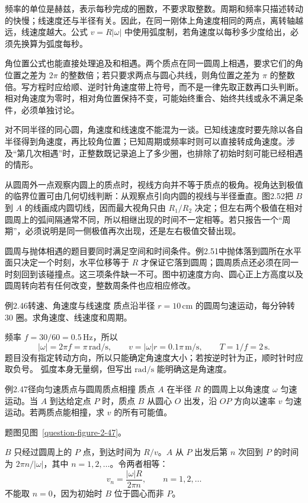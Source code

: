 频率的单位是赫兹，表示每秒完成的圈数，不要求取整数。周期和频率只描述转动的快慢；线速度还与半径有关。因此，在同一刚体上角速度相同的两点，离转轴越远，线速度越大。公式 $v=R|\omega|$ 中使用弧度制，若角速度以每秒多少度给出，必须先换算为弧度每秒。

角位置公式也能直接处理追及和相遇。两个质点在同一圆周上相遇，要求它们的角位置之差为 $2\pi$ 的整数倍；若只要求两点与圆心共线，则角位置之差为 $\pi$ 的整数倍。写方程时应给顺、逆时针角速度带上符号，而不是一律先取正数再口头判断。相对角速度为零时，相对角位置保持不变，可能始终重合、始终共线或永不满足条件，必须单独讨论。

对不同半径的同心圆，角速度和线速度不能混为一谈。已知线速度时要先除以各自半径得到角速度，再比较角位置；已知周期或频率时则可以直接转成角速度。涉及“第几次相遇”时，正整数既记录追上了多少圈，也排除了初始时刻可能已经相遇的情形。

从圆周外一点观察内圆上的质点时，视线方向并不等于质点的极角。视角达到极值的临界位置可由几何切线判断：从观察点引向内圆的视线与半径垂直。图2.52把 $B$ 到 $A$ 的线画成内圆切线，因而最大视角只由 $R_1/R_2$ 决定；但左右两个极值在相对圆周上的弧间隔通常不同，所以相继出现的时间不一定相等。若只报告一个“周期”，必须说明是同一侧极值再次出现，还是左右极值交替出现。

圆周与抛体相遇的题目要同时满足空间和时间条件。例2.51中抛体落到圆所在水平面只决定一个时刻，水平位移等于 $R$ 才保证它落到圆周；圆周质点还必须在同一时刻回到该碰撞点。这三项条件缺一不可。图中初速度方向、圆心正上方高度以及圆周转向若有任何改变，整数周条件也应相应修改。

\begin{origexamplebox}{例2.46\quad 转速、角速度与线速度}
质点沿半径 $r=10\,\mathrm{cm}$ 的圆周匀速运动，每分钟转 $30$ 圈。求角速度、线速度和周期。
\end{origexamplebox}
\begin{xesolution}
频率 $f=30/60=0.5\,\mathrm{Hz}$，所以
\[
 \boxed{|\omega|=2\pi f=\pi\,\mathrm{rad/s}},\qquad
 \boxed{v=|\omega|r=0.1\pi\,\mathrm{m/s}},\qquad
 \boxed{T=1/f=2\,\mathrm s}.
\]
题目没有指定转动方向，所以只能确定角速度大小；若按逆时针为正，顺时针时应取负号。
弧度本身无量纲，但写出 $\mathrm{rad/s}$ 能明确这是角速度。
\end{xesolution}

\begin{origexamplebox}{例2.47\quad 径向匀速质点与圆周质点相撞}
质点 $A$ 在半径 $R$ 的圆周上以角速度 $\omega$ 匀速运动。当 $A$ 到达给定点 $P$ 时，质点 $B$ 从圆心 $O$ 出发，沿 $OP$ 方向以速率 $v$ 匀速运动。若两质点能相撞，求 $v$ 的所有可能值。
\par 题图见图~\ref{question-figure-2-47}。
\KQuestionBV
\end{origexamplebox}
\begin{xesolution}
$B$ 只经过圆周上的 $P$ 点，到达时间为 $R/v$。$A$ 从 $P$ 出发后第 $n$ 次回到 $P$ 的时间为 $2\pi n/|\omega|$，其中 $n=1,2,\ldots$。令两者相等：
\RadialUniformCollisionDiagram
\[
 \boxed{v_n=\frac{|\omega|R}{2\pi n}},\qquad n=1,2,\ldots
\]
不能取 $n=0$，因为初始时 $B$ 位于圆心而非 $P$。
\end{xesolution}

